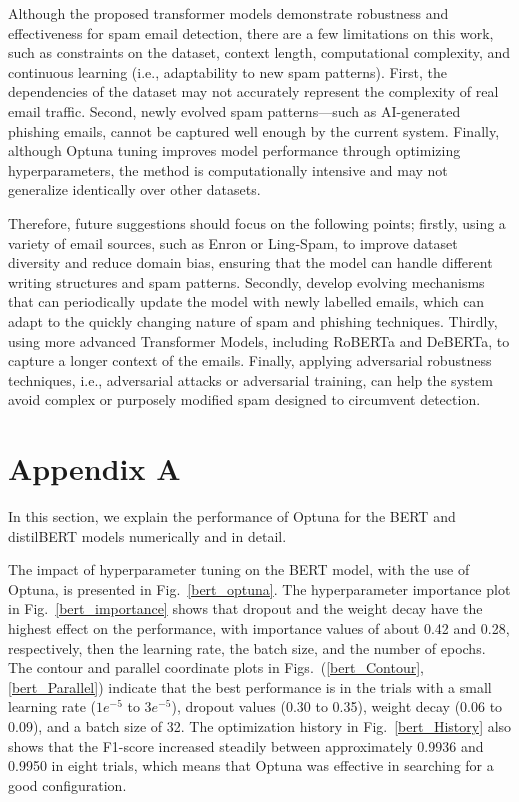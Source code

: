 \documentclass{article}
\begin{document}
Although the proposed transformer models demonstrate robustness and effectiveness for spam email detection, there are a few limitations on this work, such as constraints on the dataset, context length, computational complexity, and continuous learning (i.e., adaptability to new spam patterns). First, the dependencies of the dataset may not accurately represent the complexity of real email traffic. Second, newly evolved spam patterns—such as AI-generated phishing emails, cannot be captured well enough by the current system. Finally, although Optuna tuning improves model performance through optimizing hyperparameters, the method is computationally intensive and may not generalize identically over other datasets.

Therefore, future suggestions should focus on the following points; firstly, using a variety of email sources, such as Enron or Ling-Spam, to improve dataset diversity and reduce domain bias, ensuring that the model can handle different writing structures and spam patterns. Secondly, develop evolving mechanisms that can periodically update the model with newly labelled emails, which can adapt to the quickly changing nature of spam and phishing techniques. Thirdly, using more advanced Transformer Models, including RoBERTa and DeBERTa, to capture a longer context of the emails. Finally, applying adversarial robustness techniques, i.e., adversarial attacks or adversarial training, can help the system avoid complex or purposely modified spam designed to circumvent detection.



\newpage 
\section*{Appendix A}
In this section, we explain the performance of Optuna for the BERT and distilBERT models numerically and in detail. 

The impact of hyperparameter tuning on the BERT model, with the use of Optuna, is presented in Fig.~\ref{bert_optuna}. The hyperparameter importance plot in Fig.~\ref{bert_importance} shows that dropout and the weight decay have the highest effect on the performance, with importance values of about 0.42 and 0.28, respectively, then the learning rate, the batch size, and the number of epochs. The contour and parallel coordinate plots in Figs.~(\ref{bert_Contour},\ref{bert_Parallel}) indicate that the best performance is in the trials with a small learning rate ($1e^{-5}$ to $3e^{-5}$), dropout values (0.30 to 0.35), weight decay (0.06 to 0.09), and a batch size of 32. The optimization history in Fig.~\ref{bert_History} also shows that the F1-score increased steadily between approximately 0.9936 and 0.9950 in eight trials, which means that Optuna was effective in searching for a good configuration.
\end{document}
